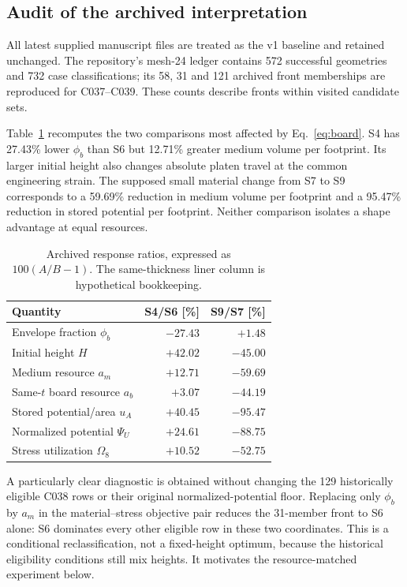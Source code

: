 \documentclass[10pt,twocolumn]{article}
\newcommand{\ua}{u_A}
\newcommand{\am}{a_m}
\newcommand{\om}{\Omega_8}
\begin{document}
\subsection{Audit of the archived interpretation}
All latest supplied manuscript files are treated as the v1 baseline and retained unchanged. The repository's mesh-24 ledger contains 572 successful geometries and 732 case classifications; its 58, 31 and 121 archived front memberships are reproduced for C037--C039. These counts describe fronts within visited candidate sets.

Table~\ref{tab:resource_audit} recomputes the two comparisons most affected by Eq.~\eqref{eq:board}. S4 has 27.43\% lower $\phi_b$ than S6 but 12.71\% greater medium volume per footprint. Its larger initial height also changes absolute platen travel at the common engineering strain. The supposed small material change from S7 to S9 corresponds to a 59.69\% reduction in medium volume per footprint and a 95.47\% reduction in stored potential per footprint. Neither comparison isolates a shape advantage at equal resources.

\begin{table}[t]
\centering\small
\caption{Archived response ratios, expressed as $100(A/B-1)$. The same-thickness liner column is hypothetical bookkeeping.}\label{tab:resource_audit}
\begin{tabular}{lrr}
\toprule Quantity & S4/S6 [\%] & S9/S7 [\%]\\\midrule
Envelope fraction $\phi_b$ & $-27.43$ & $+1.48$\\
Initial height $H$ & $+42.02$ & $-45.00$\\
Medium resource $\am$ & $+12.71$ & $-59.69$\\
Same-$t$ board resource $a_b$ & $+3.07$ & $-44.19$\\
Stored potential/area $\ua$ & $+40.45$ & $-95.47$\\
Normalized potential $\Psi_U$ & $+24.61$ & $-88.75$\\
Stress utilization $\om$ & $+10.52$ & $-52.75$\\\bottomrule
\end{tabular}
\end{table}

A particularly clear diagnostic is obtained without changing the 129 historically eligible C038 rows or their original normalized-potential floor. Replacing only $\phi_b$ by $\am$ in the material--stress objective pair reduces the 31-member front to S6 alone: S6 dominates every other eligible row in these two coordinates. This is a conditional reclassification, not a fixed-height optimum, because the historical eligibility conditions still mix heights. It motivates the resource-matched experiment below.
\end{document}
